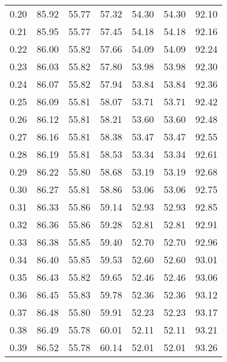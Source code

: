 \begin{tabular}{|c|c|c|c|c|c|c|}
      0.20 &     85.92 &     55.77 &      57.32 &   54.30 &      54.30 &         92.10 \\
      0.21 &     85.95 &     55.77 &      57.45 &   54.18 &      54.18 &         92.16 \\
      0.22 &     86.00 &     55.82 &      57.66 &   54.09 &      54.09 &         92.24 \\
      0.23 &     86.03 &     55.82 &      57.80 &   53.98 &      53.98 &         92.30 \\
      0.24 &     86.07 &     55.82 &      57.94 &   53.84 &      53.84 &         92.36 \\
      0.25 &     86.09 &     55.81 &      58.07 &   53.71 &      53.71 &         92.42 \\
      0.26 &     86.12 &     55.81 &      58.21 &   53.60 &      53.60 &         92.48 \\
      0.27 &     86.16 &     55.81 &      58.38 &   53.47 &      53.47 &         92.55 \\
      0.28 &     86.19 &     55.81 &      58.53 &   53.34 &      53.34 &         92.61 \\
      0.29 &     86.22 &     55.80 &      58.68 &   53.19 &      53.19 &         92.68 \\
      0.30 &     86.27 &     55.81 &      58.86 &   53.06 &      53.06 &         92.75 \\
      0.31 &     86.33 &     55.86 &      59.14 &   52.93 &      52.93 &         92.85 \\
      0.32 &     86.36 &     55.86 &      59.28 &   52.81 &      52.81 &         92.91 \\
      0.33 &     86.38 &     55.85 &      59.40 &   52.70 &      52.70 &         92.96 \\
      0.34 &     86.40 &     55.85 &      59.53 &   52.60 &      52.60 &         93.01 \\
      0.35 &     86.43 &     55.82 &      59.65 &   52.46 &      52.46 &         93.06 \\
      0.36 &     86.45 &     55.83 &      59.78 &   52.36 &      52.36 &         93.12 \\
      0.37 &     86.48 &     55.80 &      59.91 &   52.23 &      52.23 &         93.17 \\
      0.38 &     86.49 &     55.78 &      60.01 &   52.11 &      52.11 &         93.21 \\
      0.39 &     86.52 &     55.78 &      60.14 &   52.01 &      52.01 &         93.26 \\

\end{tabular}
